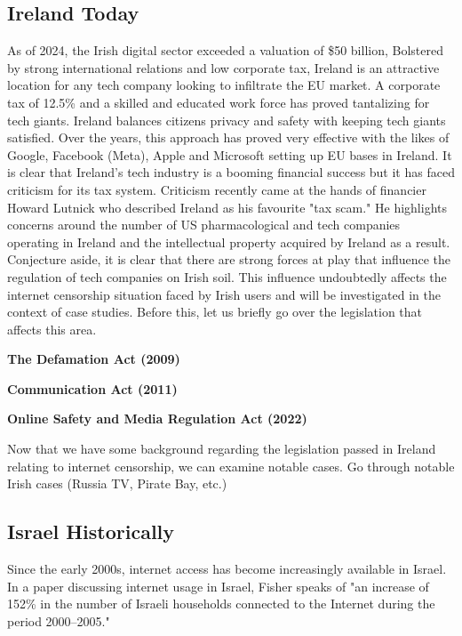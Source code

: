 \subsection{Ireland Today}
As of 2024, the Irish digital sector exceeded a valuation of \$50 billion, \cite{tradegov2025} Bolstered by strong international relations and low corporate tax, Ireland is an attractive location for any tech company looking to infiltrate the EU market. A corporate tax of 12.5\% \cite{revenueie2025} and a skilled and educated work force has proved tantalizing for tech giants. Ireland balances citizens privacy and safety with keeping tech giants satisfied. Over the years, this approach has proved very effective with the likes of Google, Facebook (Meta), Apple and Microsoft setting up EU bases in Ireland. It is clear that Ireland's tech industry is a booming financial success but it has faced criticism for its tax system. Criticism recently came at the hands of financier Howard Lutnick who described Ireland as his favourite "tax scam." \cite{archyde2025} He highlights concerns around the number of US pharmacological and tech companies operating in Ireland and the intellectual property acquired by Ireland as a result. Conjecture aside, it is clear that there are strong forces at play that influence the regulation of tech companies on Irish soil. This influence undoubtedly affects the internet censorship situation faced by Irish users and will be investigated in the context of case studies. Before this, let us briefly go over the legislation that affects this area. 

\textbf{The Defamation Act (2009)}


\textbf{Communication Act (2011)}


\textbf{Online Safety and Media Regulation Act (2022)}


Now that we have some background regarding the legislation passed in Ireland relating to internet censorship, we can examine notable cases. 
Go through notable Irish cases (Russia TV, Pirate Bay, etc.)



\subsection{Israel Historically}
Since the early 2000s, internet access has become increasingly available in Israel. In a paper discussing internet usage in Israel, Fisher speaks of "an increase of 152\% in the number of Israeli households connected to the Internet during the period 2000–2005." \cite{FISHER2006984} 

